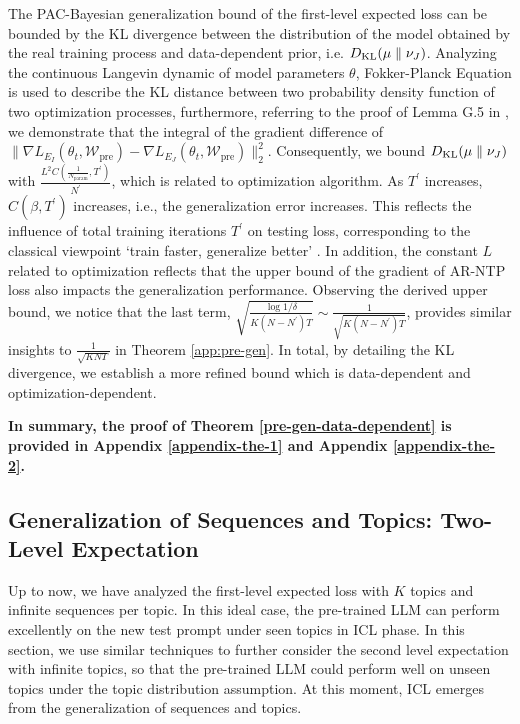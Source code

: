 \begin{remark}\label{remark-app: the2}
	The PAC-Bayesian generalization bound of the first-level expected loss can be bounded by the KL divergence between the distribution of the model obtained by the real training process and data-dependent prior, i.e. $D_{\mathrm{KL}}(\mu \parallel \nu_J)$. Analyzing the continuous Langevin dynamic of model parameters $\theta$, Fokker-Planck Equation is used to describe the KL distance between two probability density function of two optimization processes, furthermore, referring to the proof of Lemma G.5 in \cite{li2019generalization}, we demonstrate that the integral of the gradient difference of $\big\|\nabla L_{E_I}(\theta_t, \mathcal{W}_{\text{pre}})-\nabla L_{E_J}(\theta_t, \mathcal{W}_{\text{pre}})\big\|_2^2$. Consequently, we bound $D_{\mathrm{KL}}(\mu \parallel \nu_J)$ with $\frac{L^2C(\frac{1}{N_{\text{param}}},T^\prime)}{N^\prime}$, which is related to optimization algorithm. As $T^\prime$ increases, $C(\beta, T^\prime)$ increases, i.e., the generalization error increases. This reflects the influence of total training iterations $T^\prime$ on testing loss, corresponding to the classical viewpoint `train faster, generalize better’ \citep{hardt2016train, lei2020fine, zhang2022stability}. In addition, the constant $L$ related to optimization reflects that the upper bound of the gradient of AR-NTP loss also impacts the generalization performance. Observing the derived upper bound, we notice that the last term, $\sqrt{\frac{\log 1/\delta}{K(N-N^\prime)T}} \sim \frac{1}{\sqrt{K(N-N^\prime)T}}$, provides similar insights to $\frac{1}{\sqrt{KNT}}$ in Theorem \ref{app:pre-gen}. In total, by detailing the KL divergence, we establish a more refined bound which is data-dependent and optimization-dependent.
\end{remark}

\textbf{In summary, the proof of Theorem \ref{pre-gen-data-dependent} is provided in Appendix \ref{appendix-the-1} and Appendix \ref{appendix-the-2}.}

\subsection{Generalization of Sequences and Topics: Two-Level Expectation}\label{sec-app:gen-ICL}
Up to now, we have analyzed the first-level expected loss with $K$ topics and infinite sequences per topic. In this ideal case, the pre-trained LLM can perform excellently on the new test prompt under seen topics in ICL phase. In this section, we use similar techniques to further consider the second level expectation with infinite topics, so that the pre-trained LLM could perform well on unseen topics under the topic distribution assumption. At this moment, ICL emerges from the generalization of sequences and topics.

